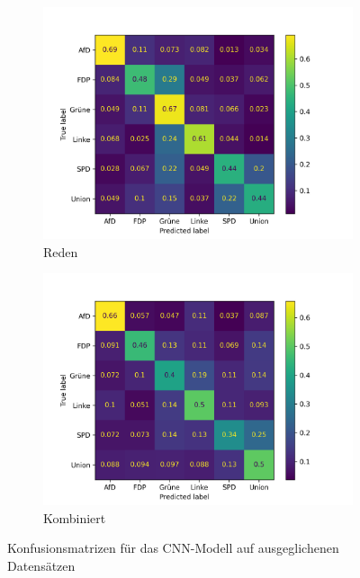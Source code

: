 \begin{figure}[H]
    \begin{subfigure}{0.49\textwidth}
        \includegraphics[width=\textwidth]{data/images/modeling/cnn/under/speeches_confusion_matrix.png}
        \caption{Reden}
        \label{sfig:confusionMatrixCnnSpeeches}
    \end{subfigure}
    \hfill
    \begin{subfigure}{0.49\textwidth}
        \includegraphics[width=\textwidth]{data/images/modeling/cnn/under/all_confusion_matrix.png}
        \caption{Kombiniert}
        \label{sfig:confusionMatrixCnnAll}
    \end{subfigure}
    \caption{Konfusionsmatrizen für das \acs{CNN}-Modell auf ausgeglichenen Datensätzen} \label{fig:confusionMatrixCnn}
\end{figure}

